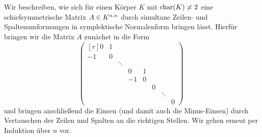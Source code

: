 \section{}





\addtocounter{subsection}{1}
\subsection{}

Wir beschreiben, wie sich für einen Körper $K$ mit $\ringchar(K) \neq 2$ eine schiefsymmetrische Matrix $A \in \matrices{n}{K}$ durch simultane Zeilen- und Spaltenumformungen in symplektische Normalenform bringen lässt.
Hierfür bringen wir die Matrix $A$ zunächst in die Form
\[
  \begin{pmatrix*}[r]
     0  & 1 &         &     &   &   &         &   \\
    -1  & 0 &         &     &   &   &         &   \\
        &   & \ddots  &     &   &   &         &   \\
        &   &         &  0  & 1 &   &         &   \\
        &   &         & -1  & 0 &   &         &   \\
        &   &         &     &   & 0 &         &   \\
        &   &         &     &   &   & \ddots  &   \\
        &   &         &     &   &   &         & 0
  \end{pmatrix*}
\]
und bringen anschließend die Einsen (und damit auch die Minus-Einsen) durch Vertauschen der Zeilen und Spalten an die richtigen Stellen.
Wir gehen erneut per Induktion über $n$ vor.

